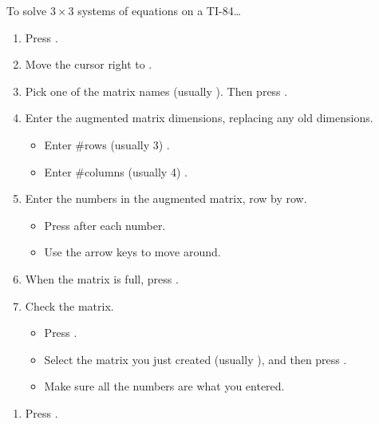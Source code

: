\newpage%
\begin{center}
\begin{minipage}[t]{1\textwidth}

\begin{myConcept}{To solve $3\times3$ systems of equations on a {\scshape TI-84}\dots}
    \begin{enumerate}%
        \item Press  .
        \item Move the cursor right to {\ttfamily [EDIT]}.
        \item Pick one of the matrix names (usually {\ttfamily [A]}). 
            Then press .
        \item Enter the augmented matrix dimensions, replacing any old dimensions.
            \begin{itemize}
                \item Enter \#rows (usually 3) .
                \item Enter \#columns (usually 4) .
            \end{itemize}
        \item Enter the numbers in the augmented matrix,
            row by row.
            \begin{itemize}
                \item Press  after each number.
                \item Use the arrow keys to move around.
            \end{itemize}
        \item When the matrix is full, press  .
        \item Check the matrix.
            \begin{itemize}
                \item Press  .
                \item Select the matrix you just created (usually {\ttfamily [A]}),
                    and then press .
                \item Make sure all the numbers are what you entered.
            \end{itemize}
    \end{enumerate}
    \begin{enumerate}
        \item Press  .

\end{enumerate}
\end{myConcept}
\end{minipage}
\end{center}
